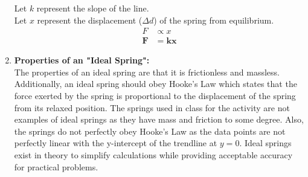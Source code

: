 \documentclass[12pt,letterpaper]{article}
\begin{document}
\begin{enumerate}[font=\bfseries]
	      Let $k$ represent the slope of the line.\\
	      Let $x$ represent the displacement ($\Delta d$) of the spring from equilibrium.
	      \[
		      \begin{aligned}
			      F      & \propto x \\
			      \bm{F} & = \bm{kx}
		      \end{aligned}
	      \]
	\item \textbf{Properties of an "Ideal Spring":}\\
	      The properties of an ideal spring are that it is frictionless and massless.
	      Additionally, an ideal spring should obey Hooke's Law which states that the force exerted by the spring is proportional to the displacement of the spring from its relaxed position.
	      The springs used in class for the activity are not examples of ideal springs as they have mass and friction to some degree.
	      Also, the springs do not perfectly obey Hooke's Law as the data points are not perfectly linear with the y-intercept of the trendline at $y=0$.
	      Ideal springs exist in theory to simplify calculations while providing acceptable accuracy for practical problems.
\end{enumerate}
\end{document}
